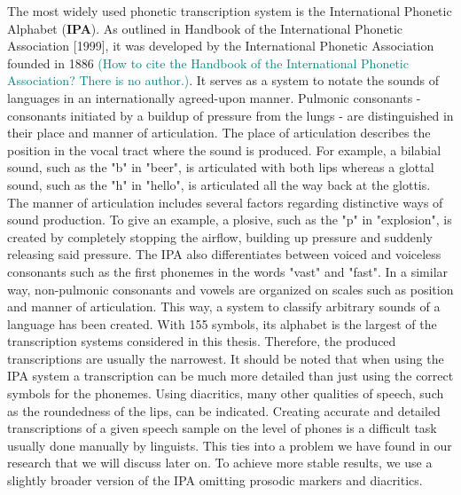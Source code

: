 The most widely used phonetic transcription system is the International Phonetic Alphabet (\textbf{IPA}). %
As outlined in Handbook of the International Phonetic Association [1999], it was developed by the International Phonetic Association founded in 1886 \textcolor{teal}{(How to cite the Handbook of the International Phonetic Association? There is no author.)}.
It serves as a system to notate the sounds of languages in an internationally agreed-upon manner.
Pulmonic consonants - consonants initiated by a buildup of pressure from the lungs - are distinguished in their place and manner of articulation.
The place of articulation describes the position in the vocal tract where the sound is produced.
For example, a bilabial sound, such as the "b" in "beer", is articulated with both lips whereas a glottal sound, such as the "h" in "hello", is articulated all the way back at the glottis.  %
The manner of articulation includes several factors regarding distinctive ways of sound production.
To give an example, a plosive, such as the "p" in "explosion", is created by completely stopping the airflow, building up pressure and suddenly releasing said pressure.
The IPA also differentiates between voiced and voiceless consonants such as the first phonemes in the words "vast" and "fast".
In a similar way, non-pulmonic consonants and vowels are organized on scales such as position and manner of articulation.
This way, a system to classify arbitrary sounds of a language has been created.
With 155 symbols, its alphabet is the largest of the transcription systems considered in this thesis.
Therefore, the produced transcriptions are usually the narrowest.
It should be noted that when using the IPA system a transcription can be much more detailed than just using the correct symbols for the phonemes.
Using diacritics, many other qualities of speech, such as the roundedness of the lips, can be indicated.
Creating accurate and detailed transcriptions of a given speech sample on the level of phones is a difficult task usually done manually by linguists.
This ties into a problem we have found in our research that we will discuss later on.
To achieve more stable results, we use a slightly broader version of the IPA omitting prosodic markers and diacritics. %
\\


